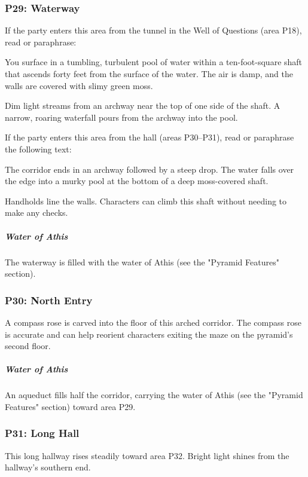 \documentclass[10pt,a4paper,twoside,bg=print,twocolumn,openany,nodeprecatedcode]{dndbook}
\begin{document}
\subsubsection{P29: Waterway}
If the party enters this area from the tunnel in the Well of Questions (area P18), read or paraphrase:

\begin{DndReadAloud}{}
You surface in a tumbling, turbulent pool of water within a ten-foot-square shaft that ascends forty feet from the surface of the water. The air is damp, and the walls are covered with slimy green moss.

Dim light streams from an archway near the top of one side of the shaft. A narrow, roaring waterfall pours from the archway into the pool.

\end{DndReadAloud}

If the party enters this area from the hall (areas P30–P31), read or paraphrase the following text:

\begin{DndReadAloud}{}
The corridor ends in an archway followed by a steep drop. The water falls over the edge into a murky pool at the bottom of a deep moss-covered shaft.

\end{DndReadAloud}

Handholds line the walls. Characters can climb this shaft without needing to make any checks.

\subparagraph{Water of Athis}
The waterway is filled with the water of Athis (see the "Pyramid Features" section).

\subsubsection{P30: North Entry}
A compass rose is carved into the floor of this arched corridor. The compass rose is accurate and can help reorient characters exiting the maze on the pyramid's second floor.

\subparagraph{Water of Athis}
An aqueduct fills half the corridor, carrying the water of Athis (see the "Pyramid Features" section) toward area P29.

\subsubsection{P31: Long Hall}
This long hallway rises steadily toward area P32. Bright light shines from the hallway's southern end.
\end{document}
